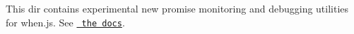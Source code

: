 This dir contains experimental new promise monitoring and debugging utilities for when.\+js. See \href{../docs/api.md\#debugging-promises}{\texttt{ the docs}}. 